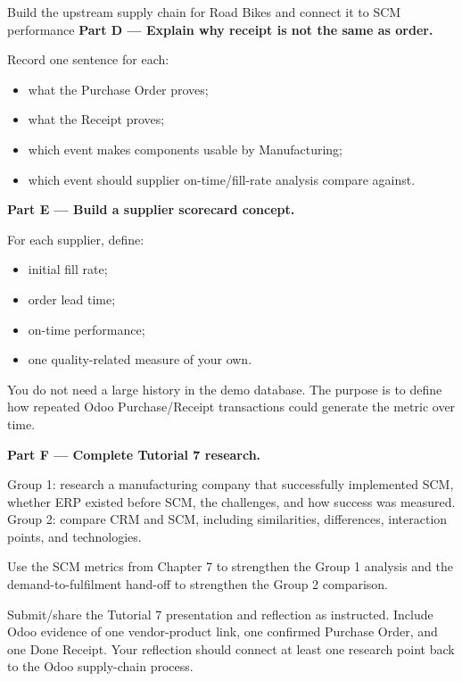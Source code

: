 \begin{labproject}{Build the upstream supply chain for Road Bikes and connect it to SCM performance}
\medskip\noindent\textbf{Part D --- Explain why receipt is not the same as order.}

Record one sentence for each:
\begin{itemize}
  \item what the Purchase Order proves;
  \item what the Receipt proves;
  \item which event makes components usable by Manufacturing;
  \item which event should supplier on-time/fill-rate analysis compare against.
\end{itemize}

\medskip\noindent\textbf{Part E --- Build a supplier scorecard concept.}

For each supplier, define:
\begin{itemize}
  \item initial fill rate;
  \item order lead time;
  \item on-time performance;
  \item one quality-related measure of your own.
\end{itemize}

You do not need a large history in the demo database. The purpose is to define how repeated Odoo Purchase/Receipt transactions could generate the metric over time.

\medskip\noindent\textbf{Part F --- Complete Tutorial 7 research.}

Group 1: research a manufacturing company that successfully implemented SCM, whether ERP existed before SCM, the challenges, and how success was measured.\\
Group 2: compare CRM and SCM, including similarities, differences, interaction points, and technologies.

Use the SCM metrics from Chapter 7 to strengthen the Group 1 analysis and the demand-to-fulfilment hand-off to strengthen the Group 2 comparison.
\end{labproject}

\begin{labdeliverable}
Submit/share the Tutorial 7 presentation and reflection as instructed. Include Odoo evidence of one vendor-product link, one confirmed Purchase Order, and one Done Receipt. Your reflection should connect at least one research point back to the Odoo supply-chain process.
\end{labdeliverable}
